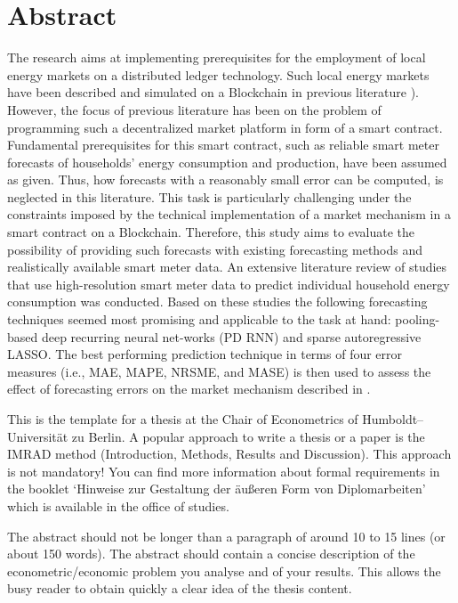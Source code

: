 \section*{Abstract}

The research aims at implementing prerequisites for the employment of local energy markets on a distributed ledger technology. Such local energy markets have been described and simulated on a Blockchain in previous literature \cite[e.g.,][]{Mengelkamp:2018a}). However, the focus of previous literature has been on the problem of programming such a decentralized market platform in form of a smart contract. Fundamental prerequisites for this smart contract, such as reliable smart meter forecasts of households’ energy consumption and production, have been assumed as given. Thus, how forecasts with a reasonably small error can be computed, is neglected in this literature. This task is particularly challenging under the constraints imposed by the technical implementation of a market mechanism in a smart contract on a Blockchain.
Therefore, this study aims to evaluate the possibility of providing such forecasts with existing forecasting methods and realistically available smart meter data. An extensive literature review of studies that use high-resolution smart meter data to predict individual household energy consumption was conducted. Based on these studies the following forecasting techniques seemed most promising and applicable to the task at hand: pooling-based deep recurring neural net-works (PD RNN) and sparse autoregressive LASSO. The best performing prediction technique in terms of four error measures (i.e., MAE, MAPE, NRSME, and MASE) is then used to assess the effect of forecasting errors on the market mechanism described in \citet{Mengelkamp:2018a}.\\\vspace{0.5cm}

This is the template for a thesis at the Chair of Econometrics of
Humboldt--Universit\"at zu Berlin. A popular approach to write a
thesis or a paper is the IMRAD method (Introduction, Methods,
Results and Discussion). This approach is not mandatory! You can
find more information about formal requirements in the booklet
`Hinweise zur Gestaltung der \"au\ss eren Form von Diplomarbeiten' which is available in the office of studies.

The abstract should not be longer than a paragraph of around 10 to 15 lines (or about 150 words). The abstract should contain a
concise description of the econometric/economic problem you
analyse and of your results. This allows the busy reader to obtain quickly a clear idea of the thesis content.
